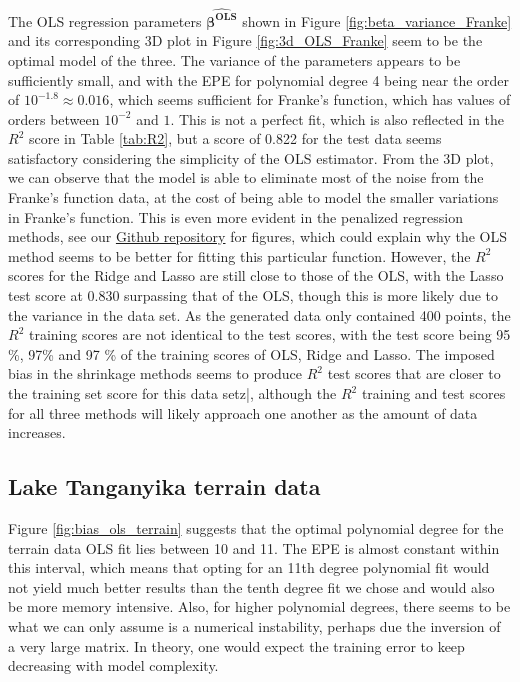 \documentclass[a4paper, 10pt]{article}
\begin{document}
\begin{multicols}{2}
The OLS regression parameters $\bm{\hat{\beta ^\text{OLS}}}$ shown in Figure \ref{fig:beta_variance_Franke} and its  corresponding 3D plot in Figure \ref{fig:3d_OLS_Franke} seem to be the optimal model of the three. The variance of the parameters appears to be sufficiently small, and with the EPE for polynomial degree 4 being near the order of $10^{-1.8}\approx 0.016$, which seems sufficient for Franke's function, which has values of orders between  $10^{{-2}}$ and $1$.  This is not a perfect fit, which is also reflected in the $R^2$ score in Table \ref{tab:R2}, but a score of 0.822 for the test data seems satisfactory considering the simplicity of the OLS estimator. From the 3D plot, we can observe that the model is able to eliminate most of the noise from the Franke's function data, at the cost of being able to model the smaller variations in Franke's function. This is even more evident in the penalized regression methods, see our \href{https://github.com/bernharl/FYS-STK4155-project1}{Github repository} for figures, which could explain why the OLS method seems to be better for fitting this particular function. However, the $R^2$ scores for the Ridge and Lasso are still close to those of the OLS, with the Lasso test score at 0.830 surpassing that of the OLS, though this is more likely due to the variance in the data set. As the generated data only contained 400 points, the $R^2$ training scores are not identical to the test scores,  with the test score being 95 \%, 97\% and 97 \% of the training scores of OLS, Ridge and Lasso. The imposed bias in the shrinkage methods seems to produce $R^2$ test scores that are closer to the training set score for this data setz|,  although the $R^2$ training and test scores for all three methods will likely approach one another as the amount of data increases.



\subsection{Lake Tanganyika terrain data}
\label{subsec:Discuss_Terrain}
Figure \ref{fig:bias_ols_terrain} suggests that the optimal polynomial degree for the terrain data OLS fit lies between 10 and 11.  The EPE is almost constant within this interval, which means that opting for an 11th degree polynomial fit would not yield much better results than the tenth degree fit we chose and would also be more memory intensive. Also, for higher polynomial degrees, there seems to be what we can only assume is a numerical instability, perhaps due the inversion of a very large matrix. In theory, one would expect the training error to keep decreasing with model complexity.


\end{multicols}
\end{document}
